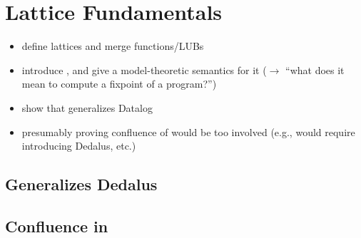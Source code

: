 \section{Lattice Fundamentals}
\label{sec:foundation}

\begin{itemize}
\item define lattices and merge functions/LUBs
\item introduce \baselang, and give a model-theoretic semantics for it ($\to$
  ``what does it mean to compute a fixpoint of a \baselang program?'')
\item show that \baselang generalizes Datalog
\item presumably proving confluence of \baselang would be too involved (e.g.,
  would require introducing Dedalus, etc.)
\end{itemize}

\subsection{\baselang Generalizes Dedalus}

\subsection{Confluence in \baselang}
